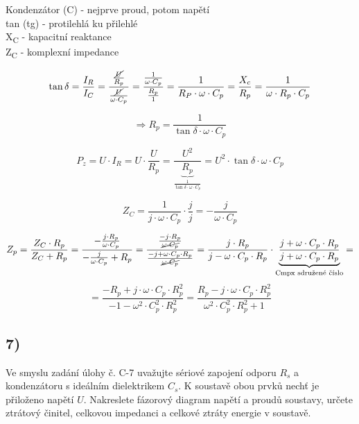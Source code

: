 Kondenzátor (C) - nejprve proud, potom napětí\\
tan (tg) - protilehlá ku přilehlé\\
X\textsubscript{C} - kapacitní reaktance\\
Z\textsubscript{C} - komplexní impedance

\begin{equation*}
    \tan \delta = \frac{I_R}{I_C} = \frac{\frac{\cancel{U}}{R_p}}{\frac{\cancel{U}}{\omega \cdot C_p}} = \frac{\frac{1}{\omega \cdot C_p}}{\frac{R_p}{1}} = \frac{1}{R_P \cdot \omega \cdot C_p} = \frac{X_c}{R_p} = \frac{1}{\omega \cdot R_p \cdot C_p} 
\end{equation*}

\begin{equation*}
    \Rightarrow R_p = \frac{1}{\tan \delta \cdot \omega \cdot C_p}
\end{equation*}

\begin{equation*}
    P_z = U \cdot I_R = U \cdot \frac{U}{R_p} = \frac{U^2}{\underbrace{R_p}_{\frac{1}{\tan \delta \cdot \omega \cdot C_p}}} = U^2 \cdot \tan \delta \cdot \omega \cdot C_p
\end{equation*}

\begin{equation*}
    Z_C = \frac{1}{j \cdot \omega \cdot C_p} \cdot \frac{j}{j} = - \frac{j}{\omega \cdot C_p}
\end{equation*}

\begin{equation*}
    Z_p = \frac{Z_C \cdot R_p}{Z_C + R_p} = \frac{- \frac{j \cdot R_p}{\omega \cdot C_p}}{- \frac{j}{\omega \cdot C_p} + R_p} = \frac{\frac{-j \cdot R_p}{\cancel{\omega \cdot C_p}}}{\frac{-j + \omega \cdot C_p \cdot R_p}{\cancel{\omega \cdot C_p}}} = \frac{j \cdot R_p}{j - \omega \cdot C_p \cdot R_p} \cdot \underbrace{\frac{j + \omega \cdot C_p \cdot R_p}{j + \omega \cdot C_p \cdot R_p}}_{\textrm{Cmpx sdružené číslo}} =
\end{equation*}
\begin{equation*}
    = \frac{-R_p + j \cdot \omega \cdot C_p \cdot R_p^2}{-1 - \omega^2 \cdot C_p^2 \cdot R_p^2} = \frac{R_p - j \cdot \omega \cdot C_p \cdot R_p^2}{\omega^2 \cdot C_p^2 \cdot R_p^2 + 1}
\end{equation*}


\subsection*{7)}
Ve smyslu zadání úlohy č. C-7 uvažujte sériové zapojení odporu $R_s$ a kondenzátoru s ideálním dielektrikem $C_s$. K soustavě obou prvků nechť je přiloženo napětí $U$. Nakreslete fázorový diagram napětí a proudů soustavy, určete ztrátový činitel, celkovou impedanci a celkové ztráty energie v soustavě.


